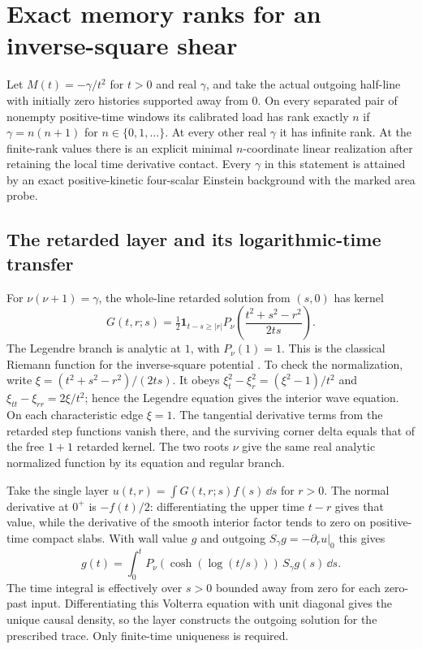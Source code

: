 \section{Exact memory ranks for an inverse-square shear}
\label{sec:ladder}

\begin{theorem}\label{thm:ladder}
Let \(M(t)=-\gamma/t^2\) for \(t>0\) and real \(\gamma\), and take the actual outgoing half-line with initially zero histories supported away from \(0\). On every separated pair of nonempty positive-time windows its calibrated load has rank exactly \(n\) if \(\gamma=n(n+1)\) for \(n\in\{0,1,\ldots\}\). At every other real \(\gamma\) it has infinite rank. At the finite-rank values there is an explicit minimal \(n\)-coordinate linear realization after retaining the local time derivative contact. Every \(\gamma\) in this statement is attained by an exact positive-kinetic four-scalar Einstein background with the marked area probe.
\end{theorem}

\subsection{The retarded layer and its logarithmic-time transfer}
For \(\nu(\nu+1)=\gamma\), the whole-line retarded solution from \((s,0)\) has kernel
\begin{equation}
 G(t,r;s)=\tfrac12{\boldsymbol1}_{t-s\ge|r|}
          P_\nu\!\left(\frac{t^2+s^2-r^2}{2ts}\right).
 \label{eq:LegGreen}
\end{equation}
The Legendre branch is analytic at \(1\), with \(P_\nu(1)=1\). This is the classical Riemann function for the inverse-square potential \cite{Legendre}. To check the normalization, write \(\xi=(t^2+s^2-r^2)/(2ts)\). It obeys \(\xi_t^2-\xi_r^2=(\xi^2-1)/t^2\) and \(\xi_{tt}-\xi_{rr}=2\xi/t^2\); hence the Legendre equation gives the interior wave equation. On each characteristic edge \(\xi=1\). The tangential derivative terms from the retarded step functions vanish there, and the surviving corner delta equals that of the free \(1+1\) retarded kernel. The two roots \(\nu\) give the same real analytic normalized function by its equation and regular branch.

Take the single layer \(u(t,r)=\int G(t,r;s)f(s)\,\dd s\) for \(r>0\). The normal derivative at \(0^+\) is \(-f(t)/2\): differentiating the upper time \(t-r\) gives that value, while the derivative of the smooth interior factor tends to zero on positive-time compact slabs. With wall value \(g\) and outgoing \(S_\gamma g=-\partial_r u|_0\) this gives
\[
          g(t)=\int_0^t P_\nu(\cosh(\log(t/s)))\,S_\gamma g(s)\,\dd s .
\]
The time integral is effectively over \(s>0\) bounded away from zero for each zero-past input. Differentiating this Volterra equation with unit diagonal gives the unique causal density, so the layer constructs the outgoing solution for the prescribed trace. Only finite-time uniqueness is required.

